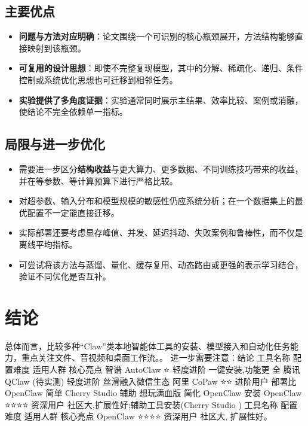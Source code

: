 \documentclass[UTF8,11pt,a4paper]{ctexart}
\newcommand{\term}[1]{\textbf{\textcolor{mainblue}{#1}}}
\begin{document}
\subsection{主要优点}
\begin{itemize}
\item \term{问题与方法对应明确}：论文围绕一个可识别的核心瓶颈展开，方法结构能够直接映射到该瓶颈。
\item \term{可复用的设计思想}：即使不完整复现模型，其中的分解、稀疏化、递归、条件控制或系统优化思想也可迁移到相邻任务。
\item \term{实验提供了多角度证据}：实验通常同时展示主结果、效率比较、案例或消融，使结论不完全依赖单一指标。
\end{itemize}

\subsection{局限与进一步优化}
\begin{itemize}
\item 需要进一步区分\term{结构收益}与更大算力、更多数据、不同训练技巧带来的收益，并在等参数、等计算预算下进行严格比较。
\item 对超参数、输入分布和模型规模的敏感性仍应系统分析；在一个数据集上的最优配置不一定能直接迁移。
\item 实际部署还要考虑显存峰值、并发、延迟抖动、失败案例和鲁棒性，而不仅是离线平均指标。
\item 可尝试将该方法与蒸馏、量化、缓存复用、动态路由或更强的表示学习结合，验证不同优化是否互补。
\end{itemize}

\section{结论}
总体而言，比较多种“Claw”类本地智能体工具的安装、模型接入和自动化任务能力，重点关注文件、音视频和桌面工作流。。 进一步需要注意：结论 工具名称 配置难度 适用人群 核心亮点 智谱 AutoClaw ⭐ 轻度进阶 一键安装,功能更 全 腾讯QClaw (待实测) 轻度进阶 丝滑融入微信生态 阿里 CoPaw ⭐⭐ 进阶用户 部署比 OpenClaw 简单 Cherry Studio 辅助 想玩满血版 简化 OpenClaw 安装 OpenClaw ⭐⭐⭐⭐ 资深用户 社区大,扩展性好;辅助工具安装(Cherry Studio ) 工具名称 配置难度 适用人群 核心亮点 OpenClaw ⭐⭐⭐⭐ 资深用户 社区大, 扩展性好。
\end{document}
